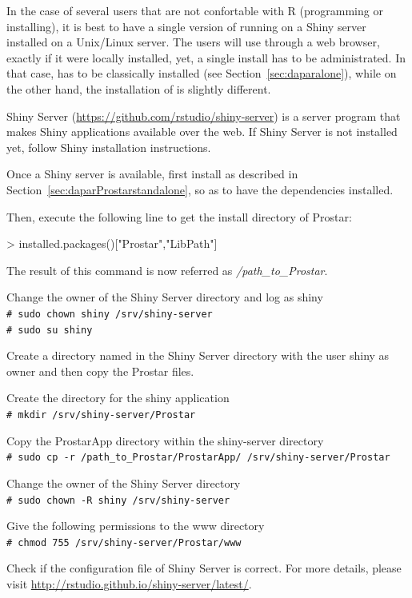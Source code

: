 \documentclass[12pt]{article}
\newcommand{\shellcmd}[1]{\\\indent\indent\texttt{\footnotesize\# #1}}
\begin{document}
In the case of several  users that are not 
confortable with R (programming or installing), it is best to have a single 
version of  running on a Shiny server 
installed on a Unix/Linux server. The users will use  through 
a web browser, exactly if it were locally installed, yet, a single install has 
to be administrated. In that case,  has to be classically 
installed (see Section~\ref{sec:daparalone}), while on the other hand, the 
installation of  is slightly different.

Shiny Server (\url{https://github.com/rstudio/shiny-server}) is a server program that 
makes Shiny applications available over the web. If Shiny Server is not installed yet, 
follow Shiny installation instructions.

Once a Shiny server is available, first install  as described in 
Section~\ref{sec:daparProstarstandalone}, so as to have the dependencies 
installed.

Then, execute the following line to get the install directory of 
Prostar:

\begin{Schunk}
\begin{Sinput}
> installed.packages()["Prostar","LibPath"]
\end{Sinput}
\end{Schunk}

The result of this command is now referred as \emph{/path\_to\_Prostar}.

Change the owner of the Shiny Server directory and log as shiny
\shellcmd{sudo chown shiny /srv/shiny-server}
\shellcmd{sudo su shiny}


Create a directory named  in the Shiny Server directory with 
the user shiny as owner and then copy the Prostar files.

Create the directory for the shiny application 
\shellcmd{mkdir /srv/shiny-server/Prostar}

Copy the ProstarApp directory within the shiny-server directory
\shellcmd{sudo cp -r /path\_to\_Prostar/ProstarApp/ /srv/shiny-server/Prostar}

Change the owner of the Shiny Server directory
\shellcmd{sudo chown -R shiny /srv/shiny-server}

Give the following permissions to the www directory
\shellcmd{chmod 755 /srv/shiny-server/Prostar/www}


Check if the configuration file of Shiny Server is correct.
For more details, please visit 
\url{http://rstudio.github.io/shiny-server/latest/}.
\end{document}
